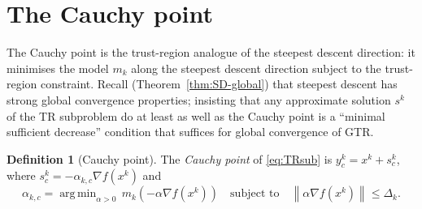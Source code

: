 \documentclass[11pt,a4paper]{report}
\theoremstyle{plain}
\theoremstyle{definition}
\newtheorem{definition}[theorem]{Definition}
\newcommand{\norm}[1]{\left\lVert#1\right\rVert}
\newcommand{\grad}{\nabla}
\DeclareMathOperator*{\argmin}{arg\,min}
\begin{document}
\section{The Cauchy point}

The Cauchy point is the trust-region analogue of the steepest descent direction:
it minimises the model $m_{k}$ along the steepest descent direction subject to the
trust-region constraint. Recall (Theorem~\ref{thm:SD-global}) that steepest descent
has strong global convergence properties; insisting that any approximate solution
$s^{k}$ of the TR subproblem do at least as well as the Cauchy point is a
``minimal sufficient decrease'' condition that suffices for global convergence
of GTR.

\begin{definition}[Cauchy point]
The \emph{Cauchy point} of \eqref{eq:TRsub} is $y^{k}_{c}=x^{k}+s^{k}_{c}$, where
$s^{k}_{c}=-\alpha_{k,c}\grad f(x^{k})$ and
\[
\alpha_{k,c}=\argmin_{\alpha>0}\, m_{k}\!\left(-\alpha\grad f(x^{k})\right)
\quad\text{subject to}\quad
\norm{\alpha\grad f(x^{k})}\le\Delta_{k}.
\]
\end{definition}
\end{document}
